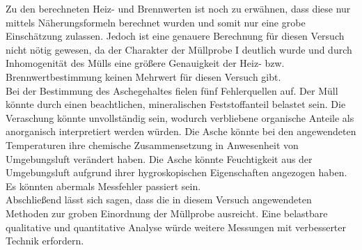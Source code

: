 Zu den berechneten Heiz- und Brennwerten ist noch zu erwähnen, dass diese nur mittels Näherungsformeln berechnet wurden und somit nur eine grobe Einschätzung zulassen. Jedoch ist eine genauere Berechnung für diesen Versuch nicht nötig gewesen, da der Charakter der Müllprobe I deutlich wurde und durch Inhomogenität des Mülls eine größere Genauigkeit der Heiz- bzw. Brennwertbestimmung keinen Mehrwert für diesen Versuch gibt.\\
Bei der Bestimmung des Aschegehaltes fielen fünf Fehlerquellen auf. Der Müll könnte durch einen beachtlichen, mineralischen Feststoffanteil belastet sein. Die Veraschung könnte unvollständig sein, wodurch verbliebene organische Anteile als anorganisch interpretiert werden würden. Die Asche könnte bei den angewendeten Temperaturen ihre chemische Zusammensetzung in Anwesenheit von Umgebungsluft verändert haben. Die Asche könnte Feuchtigkeit aus der Umgebungsluft aufgrund ihrer hygroskopischen Eigenschaften angezogen haben. Es könnten abermals Messfehler passiert sein. \\

Abschließend lässt sich sagen, dass die in diesem Versuch angewendeten Methoden zur groben Einordnung der Müllprobe ausreicht. Eine belastbare qualitative und quantitative Analyse würde weitere Messungen mit verbesserter Technik erfordern.

